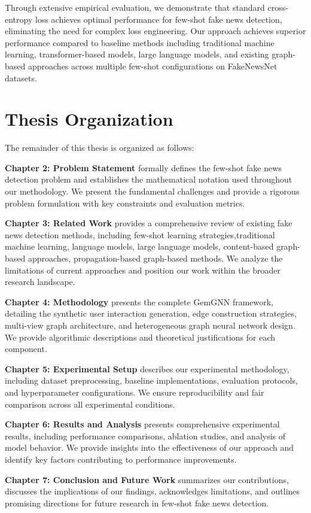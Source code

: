 Through extensive empirical evaluation, we demonstrate that standard cross-entropy loss achieves optimal performance for few-shot fake news detection, eliminating the need for complex loss engineering. Our approach achieves superior performance compared to baseline methods including traditional machine learning, transformer-based models, large language models, and existing graph-based approaches across multiple few-shot configurations on FakeNewsNet datasets.

\section{Thesis Organization}

The remainder of this thesis is organized as follows:

\textbf{Chapter 2: Problem Statement} formally defines the few-shot fake news detection problem and establishes the mathematical notation used throughout our methodology. We present the fundamental challenges and provide a rigorous problem formulation with key constraints and evaluation metrics.

\textbf{Chapter 3: Related Work} provides a comprehensive review of existing fake news detection methods, including few-shot learning strategies,traditional machine learning, language models, large language models, content-based graph-based approaches, propagation-based graph-based methods. We analyze the limitations of current approaches and position our work within the broader research landscape.

\textbf{Chapter 4: Methodology} presents the complete GemGNN framework, detailing the synthetic user interaction generation, edge construction strategies, multi-view graph architecture, and heterogeneous graph neural network design. We provide algorithmic descriptions and theoretical justifications for each component.

\textbf{Chapter 5: Experimental Setup} describes our experimental methodology, including dataset preprocessing, baseline implementations, evaluation protocols, and hyperparameter configurations. We ensure reproducibility and fair comparison across all experimental conditions.

\textbf{Chapter 6: Results and Analysis} presents comprehensive experimental results, including performance comparisons, ablation studies, and analysis of model behavior. We provide insights into the effectiveness of our approach and identify key factors contributing to performance improvements.

\textbf{Chapter 7: Conclusion and Future Work} summarizes our contributions, discusses the implications of our findings, acknowledges limitations, and outlines promising directions for future research in few-shot fake news detection.

\EndChapter
